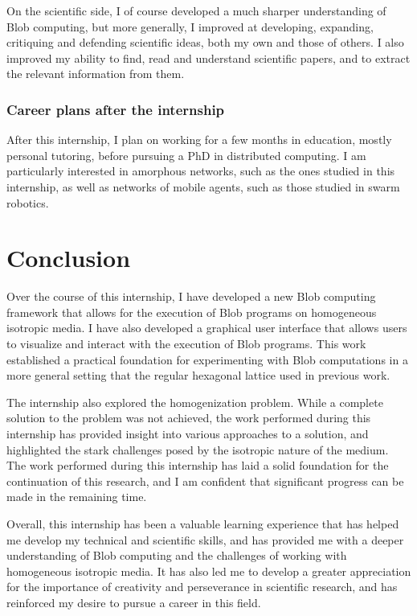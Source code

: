 \documentclass[11pt,a4paper]{report}
\begin{document}
On the scientific side, I of course developed a much sharper understanding of Blob computing, but more generally, I improved at developing, expanding, critiquing and defending scientific ideas, both my own and those of others. I also improved my ability to find, read and understand scientific papers, and to extract the relevant information from them.

\subsection{Career plans after the internship}

After this internship, I plan on working for a few months in education, mostly personal tutoring, before pursuing a PhD in distributed computing. I am particularly interested in amorphous networks, such as the ones studied in this internship, as well as networks of mobile agents, such as those studied in swarm robotics.

\chapter{Conclusion}

Over the course of this internship, I have developed a new Blob computing framework that allows for the execution of Blob programs on homogeneous isotropic media. I have also developed a graphical user interface that allows users to visualize and interact with the execution of Blob programs. This work established a practical foundation for experimenting with Blob computations in a more general setting that the regular hexagonal lattice used in previous work.

The internship also explored the homogenization problem. While a complete solution to the problem was not achieved, the work performed during this internship has provided insight into various approaches to a solution, and highlighted the stark challenges posed by the isotropic nature of the medium. The work performed during this internship has laid a solid foundation for the continuation of this research, and I am confident that significant progress can be made in the remaining time.

Overall, this internship has been a valuable learning experience that has helped me develop my technical and scientific skills, and has provided me with a deeper understanding of Blob computing and the challenges of working with homogeneous isotropic media. It has also led me to develop a greater appreciation for the importance of creativity and perseverance in scientific research, and has reinforced my desire to pursue a career in this field.
\end{document}
